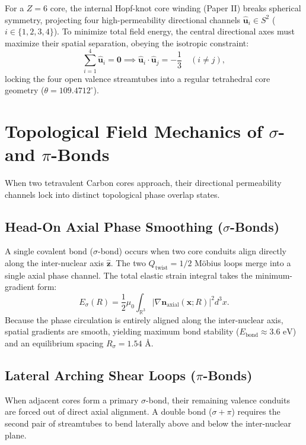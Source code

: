 \documentclass[11pt,a4paper]{article}
\begin{document}
	For a $Z=6$ core, the internal Hopf-knot core winding (Paper II) breaks spherical symmetry, projecting four high-permeability directional channels $\hat{\mathbf{u}}_i \in S^2$ ($i \in \{1,2,3,4\}$). To minimize total field energy, the central directional axes must maximize their spatial separation, obeying the isotropic constraint:
	\begin{equation}
		\sum_{i=1}^4 \hat{\mathbf{u}}_i = \mathbf{0} \implies \hat{\mathbf{u}}_i \cdot \hat{\mathbf{u}}_j = -\frac{1}{3} \quad (i \neq j),
	\end{equation}
	locking the four open valence streamtubes into a regular tetrahedral core geometry ($\theta = 109.4712^\circ$).
	
	\section{Topological Field Mechanics of \texorpdfstring{$\sigma$}{sigma}- and \texorpdfstring{$\pi$}{pi}-Bonds}
	\label{sec:sigma_pi_mechanics}
	
	When two tetravalent Carbon cores approach, their directional permeability channels lock into distinct topological phase overlap states.
	
	\subsection{Head-On Axial Phase Smoothing (\texorpdfstring{$\sigma$}{sigma}-Bonds)}
	A single covalent bond ($\sigma$-bond) occurs when two core conduits align directly along the inter-nuclear axis $\hat{\mathbf{z}}$. The two $Q_{\text{twist}} = 1/2$ Möbius loops merge into a single axial phase channel. The total elastic strain integral takes the minimum-gradient form:
	\begin{equation}
		E_\sigma(R) = \frac{1}{2}\mu_0 \int_{\mathbb{R}^3} \left| \nabla \mathbf{n}_{\text{axial}}(\mathbf{x}; R) \right|^2 d^3x.
		\label{eq:sigma_energy_functional}
	\end{equation}
	Because the phase circulation is entirely aligned along the inter-nuclear axis, spatial gradients are smooth, yielding maximum bond stability ($E_{\text{bond}} \approx 3.6 \text{ eV}$) and an equilibrium spacing $R_\sigma = \mathbf{1.54 \text{ \AA}}$.
	
	\subsection{Lateral Arching Shear Loops (\texorpdfstring{$\pi$}{pi}-Bonds)}
	When adjacent cores form a primary $\sigma$-bond, their remaining valence conduits are forced out of direct axial alignment. A double bond ($\sigma + \pi$) requires the second pair of streamtubes to bend laterally above and below the inter-nuclear plane.
	
\end{document}
